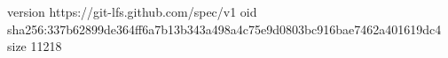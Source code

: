 version https://git-lfs.github.com/spec/v1
oid sha256:337b62899de364ff6a7b13b343a498a4c75e9d0803bc916bae7462a401619dc4
size 11218
